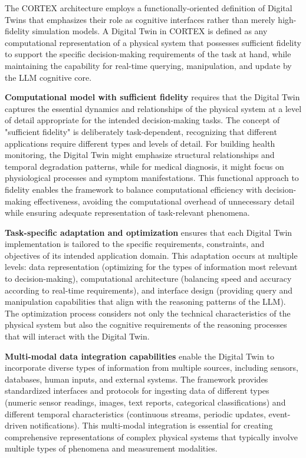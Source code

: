 The CORTEX architecture employs a functionally-oriented definition of Digital Twins that emphasizes their role as cognitive interfaces rather than merely high-fidelity simulation models. A Digital Twin in CORTEX is defined as any computational representation of a physical system that possesses sufficient fidelity to support the specific decision-making requirements of the task at hand, while maintaining the capability for real-time querying, manipulation, and update by the LLM cognitive core.

\textbf{Computational model with sufficient fidelity} requires that the Digital Twin captures the essential dynamics and relationships of the physical system at a level of detail appropriate for the intended decision-making tasks. The concept of "sufficient fidelity" is deliberately task-dependent, recognizing that different applications require different types and levels of detail. For building health monitoring, the Digital Twin might emphasize structural relationships and temporal degradation patterns, while for medical diagnosis, it might focus on physiological processes and symptom manifestations. This functional approach to fidelity enables the framework to balance computational efficiency with decision-making effectiveness, avoiding the computational overhead of unnecessary detail while ensuring adequate representation of task-relevant phenomena.

\textbf{Task-specific adaptation and optimization} ensures that each Digital Twin implementation is tailored to the specific requirements, constraints, and objectives of its intended application domain. This adaptation occurs at multiple levels: data representation (optimizing for the types of information most relevant to decision-making), computational architecture (balancing speed and accuracy according to real-time requirements), and interface design (providing query and manipulation capabilities that align with the reasoning patterns of the LLM). The optimization process considers not only the technical characteristics of the physical system but also the cognitive requirements of the reasoning processes that will interact with the Digital Twin.

\textbf{Multi-modal data integration capabilities} enable the Digital Twin to incorporate diverse types of information from multiple sources, including sensors, databases, human inputs, and external systems. The framework provides standardized interfaces and protocols for ingesting data of different types (numeric sensor readings, images, text reports, categorical classifications) and different temporal characteristics (continuous streams, periodic updates, event-driven notifications). This multi-modal integration is essential for creating comprehensive representations of complex physical systems that typically involve multiple types of phenomena and measurement modalities.

